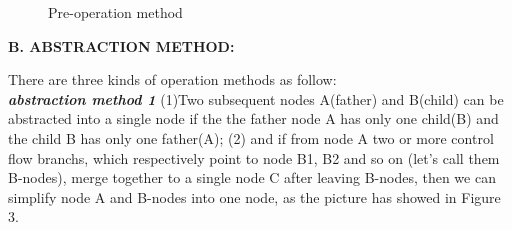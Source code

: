 \documentclass[12pt]{article}
\begin{document}
\begin{figure}
\begin{center}
\begin{minipage}[c]{0.5\textwidth}
\centering
{}
\renewcommand{\figurename}{Figure}
\caption{Pre-operation method}
\label{}
\end{minipage}
\end{center}
\end{figure}

\textbf{B. ABSTRACTION METHOD:}\



There are three kinds of operation methods as follow:\\

    \textit{\textbf{abstraction method 1}} (1)Two subsequent nodes A(father) and B(child) can be abstracted into a single node if the the father node A has only one child(B) and the child B has only one  father(A); (2)  and if from node A two or more control flow branchs, which respectively point to node B1, B2 and so on (let's call them B-nodes), merge together to a single node C after leaving B-nodes, then we can simplify node A and B-nodes into one node, as the picture has showed in Figure 3.\
    
\end{document}
